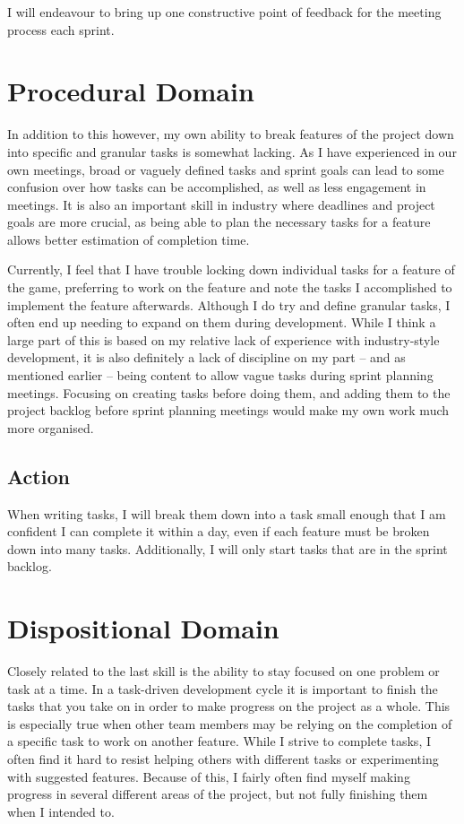 \documentclass{scrartcl}
\begin{document}
I will endeavour to bring up one constructive point of feedback for the meeting process each sprint.


\section{Procedural Domain}

In addition to this however, my own ability to break features of the project down into specific and granular tasks is somewhat lacking. As I have experienced in our own meetings, broad or vaguely defined tasks and sprint goals can lead to some confusion over how tasks can be accomplished, as well as less engagement in meetings. It is also an important skill in industry where deadlines and project goals are more crucial, as being able to plan the necessary tasks for a feature allows better estimation of completion time.

Currently, I feel that I have trouble locking down individual tasks for a feature of the game, preferring to work on the feature and note the tasks I accomplished to implement the feature afterwards. Although I do try and define granular tasks, I often end up needing to expand on them during development. While I think a large part of this is based on my relative lack of experience with industry-style development, it is also definitely a lack of discipline on my part – and as mentioned earlier – being content to allow vague tasks during sprint planning meetings. Focusing on creating tasks before doing them, and adding them to the project backlog before sprint planning meetings would make my own work much more organised. 


\subsection{Action}

When writing tasks, I will break them down into a task small enough that I am confident I can complete it within a day, even if each feature must be broken down into many tasks. Additionally, I will only start tasks that are in the sprint backlog.


\section{Dispositional Domain}

Closely related to the last skill is the ability to stay focused on one problem or task at a time. In a task-driven development cycle it is important to finish the tasks that you take on in order to make progress on the project as a whole. This is especially true when other team members may be relying on the completion of a specific task to work on another feature. While I strive to complete tasks, I often find it hard to resist helping others with different tasks or experimenting with suggested features. Because of this, I fairly often find myself making progress in several different areas of the project, but not fully finishing them when I intended to. 
\end{document}
